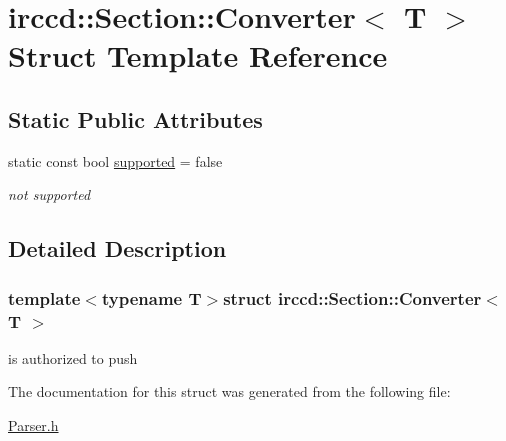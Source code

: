 \hypertarget{a00017}{\section{irccd\-:\-:Section\-:\-:Converter$<$ T $>$ Struct Template Reference}
\label{a00017}
}
\subsection*{Static Public Attributes}
\begin{DoxyCompactItemize}
\item 
\hypertarget{a00017_aff812d2ad2b62c8a84a5fea354c6ed43}{static const bool \hyperlink{a00017_aff812d2ad2b62c8a84a5fea354c6ed43}{supported} = false}\label{a00017_aff812d2ad2b62c8a84a5fea354c6ed43}

\begin{DoxyCompactList}\small\item\em not supported \end{DoxyCompactList}\end{DoxyCompactItemize}


\subsection{Detailed Description}
\subsubsection*{template$<$typename T$>$struct irccd\-::\-Section\-::\-Converter$<$ T $>$}

is authorized to push 

The documentation for this struct was generated from the following file\-:\begin{DoxyCompactItemize}
\item 
\hyperlink{a00117}{Parser.\-h}\end{DoxyCompactItemize}
